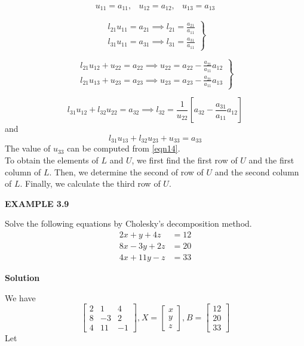 \documentclass[a4paper, 12pt]{report}
\begin{document}
{\begin{eqnarray}
u_{11}=a_{11},&  u_{12}=a_{12},&  u_{13}=a_{13}
\end{eqnarray}

\begin{equation}
\left.
\begin{array}{c}
l_{21}u_{11}=a_{21}\implies l_{21}=\frac{a_{21}}{a_{11}}\\
l_{31}u_{11}= a_{31}\implies l_{31}=\frac{a_{31}}{a_{11}}
\end{array}
\right\}
\end{equation}

\begin{equation}
\left.
\begin{array}{c}
l_{21}u_{12}+u_{22}=a_{22}\implies u_{22}=a_{22}-\frac{a_{21}}{a_{11}}a_{12}\\
l_{21}u_{13}+u_{23}= a_{23}\implies u_{23}=a_{23}-\frac{a_{21}}{a_{11}}a_{13}
\end{array}
\right\}
\end{equation}

\begin{equation}
l_{31}u_{12}+l_{32}u_{22}=a_{32}\implies l_{32}=\frac{1}{u_{22}}\left[ a_{32}-\frac{a_{31}}{a_{11}}a_{12} \right]
\end{equation}
and 
\begin{equation}
l_{31}u_{13}+l_{32}u_{23}+u_{33}=a_{33} \label{eqn14}
\end{equation}
The value of $u_{33}$ can be computed from \eqref{eqn14}.\\
To obtain the elements of $L$ and $U$, we first find the first row of $U$ and the first column of $L$. Then, we determine the second of row of $U$ and the second column of $L$. Finally, we calculate the third row of $U$.\\

\begin{center}
	\textbf{EXAMPLE 3.9}
\end{center}
Solve the following equations by Cholesky's decomposition method.
\begin{align*}
2x+y+4z&=12\\
8x-3y+2z&=20\\
4x+11y-z&=33
\end{align*}
\begin{center}
	\textbf{Solution}
\end{center}
We have
\begin{equation*}
\begin{bmatrix}
2& 1& 4\\
8& -3& 2\\
4& 11& -1
\end{bmatrix}
\text{,}\ X=
\begin{bmatrix}
x\\y\\z
\end{bmatrix}
\text{,}\  B=
\begin{bmatrix}
12\\20\\33
\end{bmatrix}
\end{equation*}
Let

}
\end{document}
